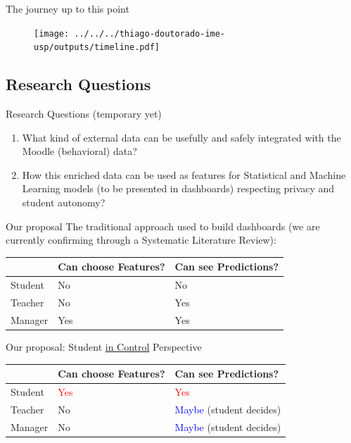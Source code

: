 \begin{frame}{The journey up to this point}
    \begin{figure}[H]
        \centering
        \texttt{[image: ../../../thiago-doutorado-ime-usp/outputs/timeline.pdf]}
    \end{figure}
\end{frame}

\subsection{Research Questions}
\begin{frame}{Research Questions (temporary yet)}
    \begin{enumerate}[<+-|alert@+>]\color{gray}
        \item What kind of external data can be usefully and safely integrated with 
              the Moodle (behavioral) data?
        \item How this enriched data can be used as features for Statistical and 
              Machine Learning models (to be presented in dashboards) respecting privacy and student autonomy?
    \end{enumerate}
\end{frame}

\begin{frame}{Our proposal}
    The traditional approach used to build dashboards (we are currently confirming through a Systematic Literature Review):

    \begin{table}[]
        \begin{tabular}{|l|l|l|} \hline
                 & Can choose Features? & Can see Predictions?\\ \hline
         Student & No                   & No                  \\ \hline
         Teacher & No                   & Yes                 \\ \hline
         Manager & Yes                  & Yes                 \\ \hline
        \end{tabular}
    \end{table}

    \pause
    Our proposal: Student \underline{in Control} Perspective
    \pause
    \begin{table}[]
        \begin{tabular}{|l|l|l|} \hline
                 & Can choose Features?  & Can see Predictions?                    \\ \hline
         Student & \textcolor{red}{Yes}  & \textcolor{red}{Yes}                    \\ \hline
         Teacher & No                    & \textcolor{blue}{Maybe} (student decides) \\ \hline
         Manager & No                    & \textcolor{blue}{Maybe} (student decides) \\ \hline
        \end{tabular}
    \end{table}

\end{frame}

